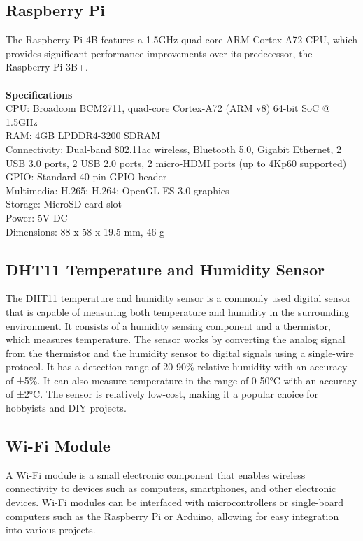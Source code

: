 \documentclass[conference]{IEEEtran}
\begin{document}
	\subsection{Raspberry Pi}
	The Raspberry Pi 4B features a 1.5GHz quad-core ARM Cortex-A72 CPU, which provides significant performance improvements over its predecessor, the Raspberry Pi 3B+\cite{c8}.\\ 
	\\\textbf{Specifications}\\
	CPU: Broadcom BCM2711, quad-core Cortex-A72 (ARM v8) 64-bit SoC @ 1.5GHz\\
	RAM: 4GB LPDDR4-3200 SDRAM\\
	Connectivity: Dual-band 802.11ac wireless, Bluetooth 5.0, Gigabit Ethernet, 2 USB 3.0 ports, 2 USB 2.0 ports, 2 micro-HDMI ports (up to 4Kp60 supported)\\
	GPIO: Standard 40-pin GPIO header\\
	Multimedia: H.265; H.264; OpenGL ES 3.0 graphics\\
	Storage: MicroSD card slot\\
	Power: 5V DC\\
	Dimensions: 88 x 58 x 19.5 mm, 46 g\\
	
	\subsection{DHT11 Temperature and Humidity Sensor}
	The DHT11 temperature and humidity sensor is a commonly used digital sensor that is capable of measuring both temperature and humidity in the surrounding environment. It consists of a humidity sensing component and a thermistor, which measures temperature. The sensor works by converting the analog signal from the thermistor and the humidity sensor to digital signals using a single-wire protocol.
	It has a detection range of 20-90\% relative humidity with an accuracy of ±5\%. It can also measure temperature in the range of 0-50°C with an accuracy of ±2°C. The sensor is relatively low-cost, making it a popular choice for hobbyists and DIY projects\cite{c9}.
	
	\subsection{Wi-Fi Module}
	A Wi-Fi module is a small electronic component that enables wireless connectivity to devices such as computers, smartphones, and other electronic devices. Wi-Fi modules can be interfaced with microcontrollers or single-board computers such as the Raspberry Pi or Arduino, allowing for easy integration into various projects.
	
\end{document}
